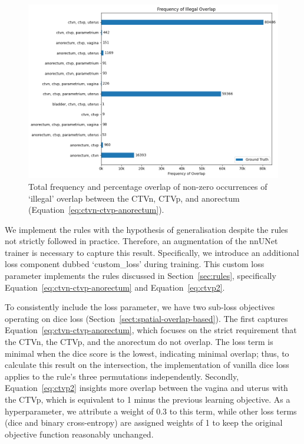 \documentclass[11pt,twoside]{report}
\begin{document}
\begin{figure}[H]
  \centering
  \includegraphics[height=.4\textheight]{../../research/source/code/nnUNet/3_gt_engineering/illegal_overlap_ground_truth.png}
  \caption{Total frequency and percentage overlap of non-zero occurrences of `illegal' overlap between the CTVn, CTVp, and anorectum (Equation~\ref{eq:ctvn-ctvp-anorectum}).}\label{fig:illegal_overlap}
\end{figure}

We implement the rules with the hypothesis of generalisation despite the rules not strictly followed in practice. Therefore, an augmentation of the nnUNet trainer is necessary to capture this result. Specifically, we introduce an additional loss component dubbed `custom\_loss' during training. This custom loss parameter implements the rules discussed in Section~\ref{sec:rules}, specifically Equation~\ref{eq:ctvn-ctvp-anorectum} and Equation~\ref{eq:ctvp2}. 

To consistently include the loss parameter, we have two sub-loss objectives operating on dice loss (Section~\ref{sect:spatial-overlap-based}). The first captures Equation~\ref{eq:ctvn-ctvp-anorectum}, which focuses on the strict requirement that the CTVn, the CTVp, and the anorectum do not overlap. The loss term is minimal when the dice score is the lowest, indicating minimal overlap; thus, to calculate this result on the intersection, the implementation of vanilla dice loss applies to the rule's three permutations independently. Secondly, Equation~\ref{eq:ctvp2} insights more overlap between the vagina and uterus with the CTVp, which is equivalent to 1 minus the previous learning objective. As a hyperparameter, we attribute a weight of 0.3 to this term, while other loss terms (dice and binary cross-entropy) are assigned weights of 1 to keep the original objective function reasonably unchanged.
\end{document}
